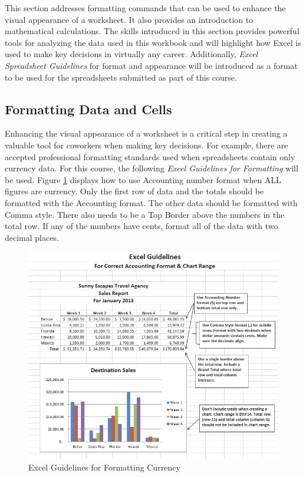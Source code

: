 This section addresses formatting commands that can be used to enhance the visual appearance of a worksheet. It also provides an introduction to mathematical calculations. The skills introduced in this section provides powerful tools for analyzing the data used in this workbook and will highlight how Excel is used to make key decisions in virtually any career. Additionally, \textit{Excel Spreadsheet Guidelines} for format and appearance will be introduced as a format to be used for the spreadsheets submitted as part of this course.

\subsection{Formatting Data and Cells}

Enhancing the visual appearance of a worksheet is a critical step in creating a valuable tool for coworkers when making key decisions. For example, there are accepted professional formatting standards used when spreadsheets contain only currency data. For this course, the following \textit{Excel Guidelines for Formatting} will be used. Figure \ref{01:fig32} displays how to use Accounting number format when ALL figures are currency. Only the first row of data and the totals should be formatted with the Accounting format. The other data should be formatted with Comma style. There also needs to be a Top Border above the numbers in the total row. If any of the numbers have cents, format all of the data with two decimal places.

\begin{figure}[H]
	\centering
	\includegraphics[width=\maxwidth{.95\linewidth}]{gfx/ch01_fig32}
	\caption{Excel Guidelines for Formatting Currency}
	\label{01:fig32}
\end{figure}


